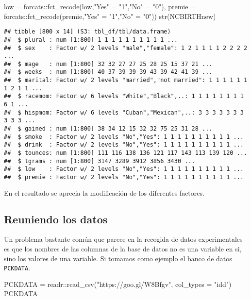 \documentclass[
]{book}
\newenvironment{Shaded}{\begin{snugshade}}{\end{snugshade}}
\newcommand{\AttributeTok}[1]{\textcolor[rgb]{0.77,0.63,0.00}{#1}}
\newcommand{\FunctionTok}[1]{\textcolor[rgb]{0.00,0.00,0.00}{#1}}
\newcommand{\NormalTok}[1]{#1}
\newcommand{\OtherTok}[1]{\textcolor[rgb]{0.56,0.35,0.01}{#1}}
\newcommand{\SpecialCharTok}[1]{\textcolor[rgb]{0.00,0.00,0.00}{#1}}
\newcommand{\StringTok}[1]{\textcolor[rgb]{0.31,0.60,0.02}{#1}}
\begin{document}
\begin{Shaded}
\begin{Highlighting}[]
              \AttributeTok{low =}\NormalTok{ forcats}\SpecialCharTok{::}\FunctionTok{fct\_recode}\NormalTok{(low,}\StringTok{"Yes"} \OtherTok{=} \StringTok{"1"}\NormalTok{,}\StringTok{"No"} \OtherTok{=} \StringTok{"0"}\NormalTok{),}
              \AttributeTok{premie =}\NormalTok{ forcats}\SpecialCharTok{::}\FunctionTok{fct\_recode}\NormalTok{(premie,}\StringTok{"Yes"} \OtherTok{=} \StringTok{"1"}\NormalTok{,}\StringTok{"No"} \OtherTok{=} \StringTok{"0"}\NormalTok{))}
\FunctionTok{str}\NormalTok{(NCBIRTHnew)}
\end{Highlighting}
\end{Shaded}

\begin{verbatim}
## tibble [800 x 14] (S3: tbl_df/tbl/data.frame)
##  $ plural : num [1:800] 1 1 1 1 1 1 1 1 1 1 ...
##  $ sex    : Factor w/ 2 levels "male","female": 1 2 1 1 1 1 2 2 2 2 ...
##  $ mage   : num [1:800] 32 32 27 27 25 28 25 15 37 21 ...
##  $ weeks  : num [1:800] 40 37 39 39 39 43 39 42 41 39 ...
##  $ marital: Factor w/ 2 levels "married","not married": 1 1 1 1 1 1 1 2 1 1 ...
##  $ racemom: Factor w/ 6 levels "White","Black",..: 1 1 1 1 1 1 1 1 6 1 ...
##  $ hispmom: Factor w/ 6 levels "Cuban","Mexican",..: 3 3 3 3 3 3 3 3 3 3 ...
##  $ gained : num [1:800] 38 34 12 15 32 32 75 25 31 28 ...
##  $ smoke  : Factor w/ 2 levels "No","Yes": 1 1 1 1 1 1 1 1 1 1 ...
##  $ drink  : Factor w/ 2 levels "No","Yes": 1 1 1 1 1 1 1 1 1 1 ...
##  $ tounces: num [1:800] 111 116 138 136 121 117 143 113 139 120 ...
##  $ tgrams : num [1:800] 3147 3289 3912 3856 3430 ...
##  $ low    : Factor w/ 2 levels "No","Yes": 1 1 1 1 1 1 1 1 1 1 ...
##  $ premie : Factor w/ 2 levels "No","Yes": 1 1 1 1 1 1 1 1 1 1 ...
\end{verbatim}

En el resultado se aprecia la modificación de los diferentes factores.

\hypertarget{reuniendo-los-datos}{%
\subsection{Reuniendo los datos}\label{reuniendo-los-datos}}

Un problema bastante común que parece en la recogida de datos experimentales es que los nombres de las columnas de la base de datos no es una variable en si, sino los valores de una variable. Si tomamos como ejemplo el banco de datos \texttt{PCKDATA}.

\begin{Shaded}
\begin{Highlighting}[]
\NormalTok{PCKDATA }\OtherTok{=}\NormalTok{ readr}\SpecialCharTok{::}\FunctionTok{read\_csv}\NormalTok{(}\StringTok{"https://goo.gl/W8Bfgv"}\NormalTok{, }\AttributeTok{col\_types =} \StringTok{"idd"}\NormalTok{)}
\NormalTok{PCKDATA}
\end{Highlighting}
\end{Shaded}
\end{document}
